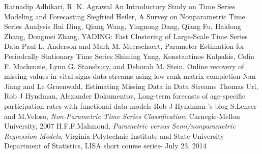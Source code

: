 \begin{thebibliography}{99}
 Ratnadip Adhikari, R. K. Agrawal An Introductory Study on Time Series Modeling and Forecasting
 Siegfried Heiler, A Survey on Nonparametric Time Series Analysis
 Rui Ding, Qiang Wang, Yingnong Dang, Qiang Fu, Haidong Zhang, Dongmei Zhang, YADING: Fast Clustering of Large-Scale Time Series Data
 Paul L. Anderson and Mark M. Meerschaert, Parameter Estimation for Periodcally Stationary Time Series
 Shiming Yang, Konstantinos Kalpakis, Colin F. Mackenzie, Lynn G. Stansbury, and Deborah M. Stein, Online recovery of missing values in vital signs data streams using low-rank matrix completion
 Nan Jiang and Le Gruenwald, Estimating Missing Data in Data Streams
 Thomas Url, Rob J Hyndman, Alexander Dokumentov, Long-term forecasts of age-speciﬁc participation rates with functional data models  
 
 Rob J Hyndman 's blog   
 S.Lenser and M.Veloso, \textit{Non-Parametric Time Series Classification}, Carnegie-Mellon University, 2007
 H.F.F.Mahmoud, \textit{Parametric versus Semi/nonparametric Regression Models}, Virginia Polytechnic Institute and State University Department of Statistics, LISA short course series- July 23, 2014
\end{thebibliography}

%



